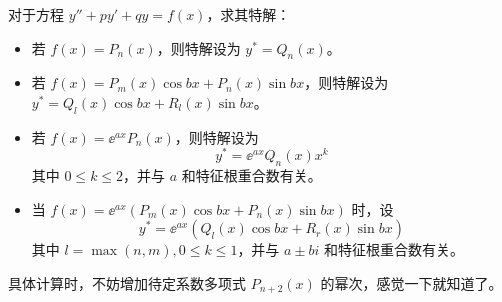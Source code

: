 对于方程 $y'' + py' + qy = f(x)$，求其特解：

\begin{itemize}
	\item 若 $f(x) = P_n(x)$，则特解设为 $y^* = Q_n(x)$。
	\item 若 $f(x) = P_m(x) \cos b x + P_n(x) \sin b x$，则特解设为 $y^* = Q_l(x) \cos b x + R_l(x) \sin b x$。
	\item 若 $f(x) = \ee^{a x} P_n(x)$，则特解设为 
	\[ y^* = \ee^{ax} Q_n(x) x^k \]
	其中 $0 \leqslant k \leqslant 2$，并与 $a$ 和特征根重合数有关。
	\item 当 $f(x) = \ee^{ax}\left( P_m(x) \cos b x + P_n(x) \sin b x \right)$ 时，设
	      \[ y^* = \ee^{ax}\left( Q_l(x) \cos b x + R_r(x) \sin b x \right) \]
	其中 $l = \max(n, m), 0 \leqslant k \leqslant 1$，并与 $a \pm bi$ 和特征根重合数有关。
\end{itemize}

具体计算时，不妨增加待定系数多项式 $P_{n+2}(x)$ 的幂次，感觉一下就知道了。 
